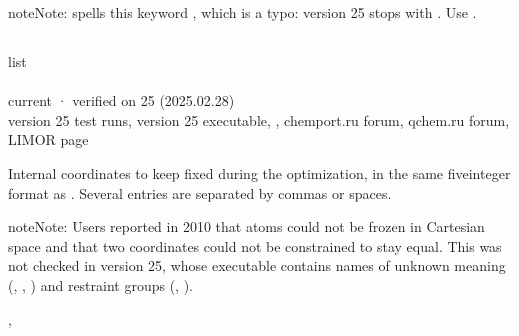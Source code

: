 \documentclass[letterpaper,10pt,english,openany,oneside]{sphinxmanual}
\begin{document}
\begin{sphinxadmonition}{note}{Note:}
\sphinxAtStartPar
{} spells this keyword , which is a typo: version 25 stops with . Use .
\end{sphinxadmonition}

\sphinxAtStartPar
{} {\hyperref[\detokenize{reference/optimize:optimize-fix}]{}}


\subsection{}
\label{\detokenize{reference/optimize:fix}}\label{\detokenize{reference/optimize:optimize-fix}}
\ignorespaces 
\sphinxAtStartPar
{} list\\
 \\
 current · verified on 25 (2025.02.28)\\
 version 25 test runs, version 25 executable, , chemport.ru forum, qchem.ru forum, LIMOR page

\sphinxAtStartPar
Internal coordinates to keep fixed during the optimization, in the same five\sphinxhyphen{}integer format as
. Several entries are separated by commas or spaces.

\begin{sphinxadmonition}{note}{Note:}
\sphinxAtStartPar
Users reported in 2010 that atoms could not be frozen in Cartesian space and that two coordinates could not be
constrained to stay equal. This was not checked in version 25, whose executable contains  names of
unknown meaning (, , ) and restraint groups (, ).
\end{sphinxadmonition}

\sphinxAtStartPar
{} {\hyperref[\detokenize{reference/optimize:optimize-value}]{}}, {\hyperref[\detokenize{reference/optimize:optimize-coordinates}]{}}
\end{document}
